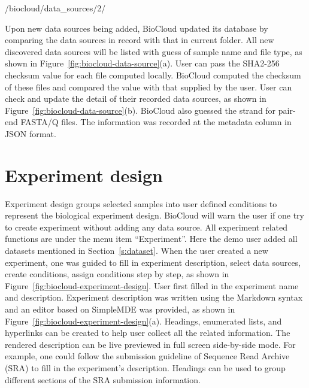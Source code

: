 \begin{CVerbatim}[fontsize=\small]
/biocloud/data_sources/2/
\end{CVerbatim}

\vspace{-1em}\noindent
Upon new data sources being added, BioCloud updated its database by comparing
the data sources in record with that in current folder. All new discovered data
sources will be listed with guess of sample name and file type, as shown in
Figure~\ref{fig:biocloud-data-source}(a). User can pass the SHA2-256 checksum
value for each file computed locally. BioCloud computed the checksum of these
files and compared the value with that supplied by the user. User can check and
update the detail of their recorded data sources, as shown in
Figure~\ref{fig:biocloud-data-source}(b). BioCloud also guessed the strand for
pair-end FASTA/Q files. The information was recorded at the metadata column in
JSON format.





\section{Experiment design}




Experiment design groups selected samples into user defined conditions to
represent the biological experiment design. BioCloud will warn the user if one
try to create experiment without adding any data source. All experiment related
functions are under the menu item ``Experiment''. Here the demo user added all
datasets mentioned in Section~\ref{s:dataset}. When the user created a new
experiment, one was guided to fill in experiment description, select data
sources, create conditions, assign conditions step by step, as shown in
Figure~\ref{fig:biocloud-experiment-design}. User first filled in the
experiment name and description. Experiment description was written using the
Markdown syntax and an editor based on SimpleMDE was provided, as shown in
Figure~\ref{fig:biocloud-experiment-design}(a). Headings, enumerated lists, and
hyperlinks can be created to help user collect all the related information. The
rendered description can be live previewed in full screen side-by-side mode.
For example, one could follow the submission guideline of Sequence Read Archive
(SRA) to fill in the experiment's description. Headings can be used to group
different sections of the SRA submission information.

